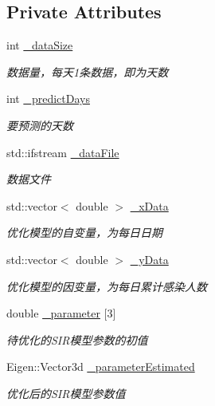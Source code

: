 \subsection*{Private Attributes}
\begin{DoxyCompactItemize}
\item 
int \hyperlink{classnCoV_a7182f86ff0f0f607cd461ebe738fb9da}{\+\_\+data\+Size}
\begin{DoxyCompactList}\small\item\em 数据量，每天1条数据，即为天数 \end{DoxyCompactList}\item 
int \hyperlink{classnCoV_a71d73f9132ff05684bb8f830bd1f4232}{\+\_\+predict\+Days}
\begin{DoxyCompactList}\small\item\em 要预测的天数 \end{DoxyCompactList}\item 
std\+::ifstream \hyperlink{classnCoV_a9585e58cac7c3c4cf26fe0291b809f06}{\+\_\+data\+File}
\begin{DoxyCompactList}\small\item\em 数据文件 \end{DoxyCompactList}\item 
std\+::vector$<$ double $>$ \hyperlink{classnCoV_a11802f3972f62a07b77b1847f1d010a8}{\+\_\+x\+Data}
\begin{DoxyCompactList}\small\item\em 优化模型的自变量，为每日日期 \end{DoxyCompactList}\item 
std\+::vector$<$ double $>$ \hyperlink{classnCoV_a8e122688ffc8ee32df05f0cb6ef25920}{\+\_\+y\+Data}
\begin{DoxyCompactList}\small\item\em 优化模型的因变量，为每日累计感染人数 \end{DoxyCompactList}\item 
double \hyperlink{classnCoV_ae34cb58fd08703599158b69853b659a2}{\+\_\+parameter} \mbox{[}3\mbox{]}
\begin{DoxyCompactList}\small\item\em 待优化的\+S\+I\+R模型参数的初值 \end{DoxyCompactList}\item 
Eigen\+::\+Vector3d \hyperlink{classnCoV_a6980bf4492a8ce437b15ac9625eacfce}{\+\_\+parameter\+Estimated}
\begin{DoxyCompactList}\small\item\em 优化后的\+S\+I\+R模型参数值 \end{DoxyCompactList}\end{DoxyCompactItemize}


